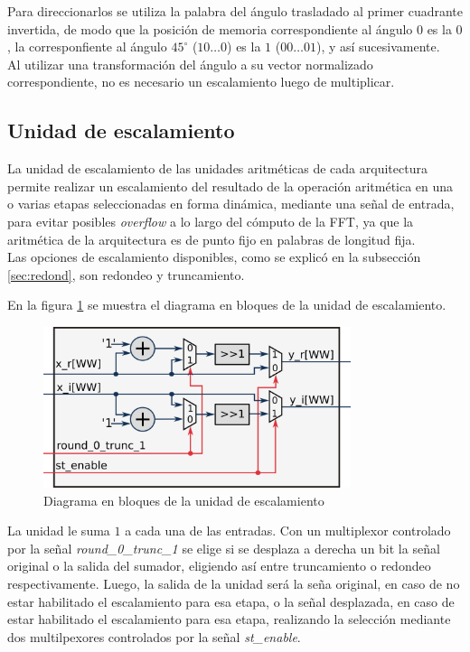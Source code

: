 Para direccionarlos se utiliza la palabra del ángulo trasladado al primer cuadrante invertida, de
modo que la posición de memoria correspondiente al ángulo $0$ es la $0$, la corresponfiente al
ángulo $45^\circ$ ($10\ldots0$) es la $1$ ($00\ldots01$), y así sucesivamente.\\

Al utilizar una transformación del ángulo a su vector normalizado correspondiente, no es necesario
un escalamiento luego de multiplicar.

\subsection{Unidad de escalamiento} \label{sec:secEscal}

La unidad de escalamiento de las unidades aritméticas de cada arquitectura permite realizar un
escalamiento del resultado de la operación aritmética en una o varias etapas seleccionadas en forma
dinámica, mediante una señal de entrada, para evitar posibles \textit{overflow} a lo largo del
cómputo de la FFT, ya que la aritmética de la arquitectura es de punto fijo en palabras de longitud
fija.\\

Las opciones de escalamiento disponibles, como se explicó en la subsección \ref{sec:redond}, son
redondeo y truncamiento.

En la figura \ref{fig:escBlocks} se muestra el diagrama en bloques de la unidad de escalamiento.

\begin{figure}[htb!]
        \centering
        \includegraphics[width=9cm]{./figures/escBlocks.png}
        \caption{Diagrama en bloques de la unidad de escalamiento}
        \label{fig:escBlocks}
\end{figure}

La unidad le suma $1$ a cada una de las entradas. Con un multiplexor controlado por la señal
\textit{round\_0\_trunc\_1} se elige si se desplaza a derecha un bit la señal original o la salida
del sumador, eligiendo así entre truncamiento o redondeo respectivamente. Luego, la salida de la unidad
será la seña original, en caso de no estar habilitado el escalamiento para esa etapa, o la señal
desplazada, en caso de estar habilitado el escalamiento para esa etapa, realizando la selección
mediante dos multilpexores controlados por la señal \textit{st\_enable}.

